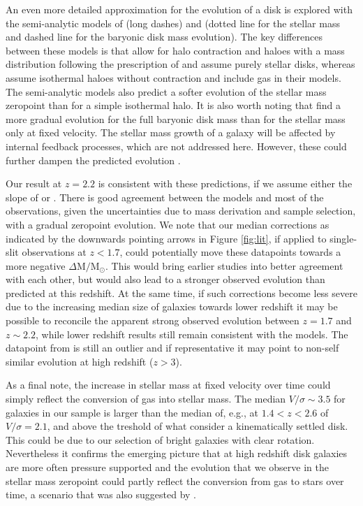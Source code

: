 \documentclass{emulateapj}
\newcommand{\msun}{$\mathrm{M_{\odot}}$}
\begin{document}
{{An even more detailed approximation for the evolution of a disk is explored with the semi-analytic models of \citet{Somerville08} (long dashes) and \citet{Dutton11} (dotted line for the stellar mass and dashed line for the baryonic disk mass evolution). The key differences between these models is that \citet{Somerville08} allow for halo contraction and haloes with a mass distribution following the prescription of \citet{Navarro97} and assume purely stellar disks, whereas \citet{Dutton11} assume isothermal haloes without contraction and include gas in their models.} The semi-analytic models also predict a softer evolution of the stellar mass zeropoint than for a simple isothermal halo. It is also worth noting that \citet{Dutton11} find a more gradual evolution for the full baryonic disk mass than for the stellar mass only at fixed velocity. The stellar mass growth of a galaxy will be affected by internal feedback processes, which are not addressed here. However, these could further dampen the predicted evolution \citep{Sales10}.


Our result at $z=2.2$ is consistent with these predictions{, if we assume either the slope of \citet{Bell01} or \citet{Reyes11}}. There is good agreement between the models and {most of} the observations{, given the uncertainties due to mass derivation and sample selection}, with a gradual zeropoint evolution. {We note that our median corrections as indicated by the downwards pointing arrows in Figure \ref{fig:lit}, if applied to single-slit observations at $z<1.7$, could potentially move these datapoints towards a more negative $\Delta \mathrm{M}/$\msun. This would bring earlier studies into better agreement with each other, but would also lead to a stronger observed evolution than predicted at this redshift. At the same time, if such corrections become less severe due to the increasing median size of galaxies towards lower redshift \citep[e.g.,][]{vanderWel14a} it may be possible to reconcile the apparent strong observed evolution between $z=1.7$ \citep{Miller12} and $z\sim2.2$, while lower redshift results still remain consistent with the models.}
The datapoint from \citet{Gnerucci11} is still an outlier and if representative it may point to non-self similar evolution at high redshift ($z>3$). 


{As a final note, the increase in stellar mass at fixed velocity over time could simply reflect the conversion of gas into stellar mass.} The median $V/\sigma\sim3.5$ for galaxies in our sample is larger than the median of, e.g., \citet{Price15} at $1.4<z<2.6$ of $V/\sigma=2.1$, and above the treshold of what \citet{Kassin12} consider a kinematically settled disk. This could {be due to} our selection of bright galaxies with clear rotation. Nevertheless it confirms the emerging picture that at high redshift disk galaxies are more often pressure supported {and} the evolution {that we observe} in {the} stellar mass {zeropoint} could {partly} reflect the conversion from gas to stars over time{, a scenario that was also suggested by \citet{Simons16}}.



}
\end{document}
